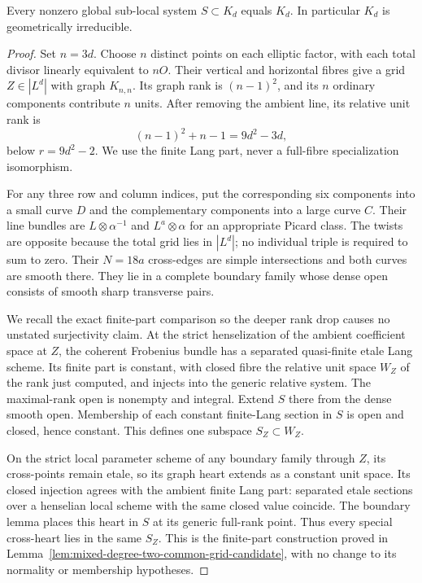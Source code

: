 \begin{lemma}
\label{lem:mixed-even-uniform-common-grid-candidate}
Every nonzero global sub-local system $S\subset K_d$
equals $K_d$. In particular $K_d$ is geometrically irreducible.
\end{lemma}
\begin{proof}
Set $n=3d$. Choose $n$ distinct points on each elliptic
factor, with each total divisor linearly equivalent to
$nO$. Their vertical and horizontal fibres give a grid
$Z\in|L^d|$ with graph $K_{n,n}$. Its graph rank is
$(n-1)^2$, and its $n$ ordinary components contribute
$n$ units. After removing the ambient line, its relative
unit rank is
\[
                (n-1)^2+n-1=9d^2-3d,
\]
below $r=9d^2-2$. We use the finite Lang part, never a
full-fibre specialization isomorphism.

For any three row and column indices, put the corresponding
six components into a small curve $D$ and the complementary
components into a large curve $C$. Their line bundles are
$L\otimes\alpha^{-1}$ and $L^a\otimes\alpha$ for an
appropriate Picard class. The twists are opposite because
the total grid lies in $|L^d|$; no individual triple is
required to sum to zero. Their $N=18a$ cross-edges are
simple intersections and both curves are smooth there.
They lie in a complete boundary family whose dense open
consists of smooth sharp transverse pairs.

We recall the exact finite-part comparison so the deeper
rank drop causes no unstated surjectivity claim. At the
strict henselization of the ambient coefficient space at
$Z$, the coherent Frobenius bundle has a separated
quasi-finite etale Lang scheme. Its finite part is constant,
with closed fibre the relative unit space $W_Z$ of the
rank just computed, and injects into the generic relative
system. The maximal-rank open is nonempty and integral.
Extend $S$ there from the dense smooth open. Membership
of each constant finite-Lang section in $S$ is open and
closed, hence constant. This defines one subspace
$S_Z\subset W_Z$.

On the strict local parameter scheme of any boundary
family through $Z$, its cross-points remain etale, so
its graph heart extends as a constant unit space. Its
closed injection agrees with the ambient finite Lang
part: separated etale sections over a henselian local
scheme with the same closed value coincide. The boundary
lemma places this heart in $S$ at its generic full-rank
point. Thus every special cross-heart lies in the same
$S_Z$. This is the finite-part construction proved in
Lemma~\ref{lem:mixed-degree-two-common-grid-candidate},
with no change to its normality or membership hypotheses.


\end{proof}
